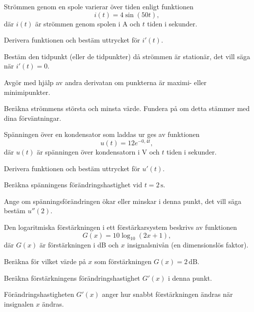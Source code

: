 
Strömmen genom en spole varierar över tiden enligt funktionen
\[
  i(t) = 4\sin(50t),
\]
där $i(t)$ är strömmen genom spolen i A och $t$ tiden i sekunder.
\begin{parts}
  \item Derivera funktionen och bestäm uttrycket för $i'(t)$.
  \item Bestäm den tidpunkt (eller de tidpunkter) då strömmen är stationär, det vill säga när
    $i'(t) = 0$.
  \item Avgör med hjälp av andra derivatan om punkterna är maximi- eller minimipunkter.
  \item Beräkna strömmens största och minsta värde. Fundera på om detta stämmer med dina
    förväntningar.
\end{parts}

Spänningen över en kondensator som laddas ur ges av funktionen
\[
  u(t) = 12e^{-0{,}4t},
\]
där $u(t)$ är spänningen över kondensatorn i V och $t$ tiden i sekunder.
\begin{parts}
  \item Derivera funktionen och bestäm uttrycket för $u'(t)$.
  \item Beräkna spänningens förändringshastighet vid $t = 2\,\text{s}$.
  \item Ange om spänningsförändringen ökar eller minskar i denna punkt, det vill säga bestäm
    $u''(2)$.
\end{parts}

Den logaritmiska förstärkningen i ett förstärkarsystem beskrivs av funktionen
\[
  G(x) = 10\log_{10}(2x + 1),
\]
där $G(x)$ är förstärkningen i dB och $x$ insignalsnivån (en dimensionslös faktor).
\begin{parts}
  \item Beräkna för vilket värde på $x$ som förstärkningen $G(x) = 2\,\text{dB}$.
  \item Beräkna förstärkningens förändringshastighet $G'(x)$ i denna punkt.
\end{parts}

\begin{aside}
\note[Notering] Förändringshastigheten $G'(x)$ anger hur snabbt förstärkningen ändras när
insignalen $x$ ändras.
\end{aside}

